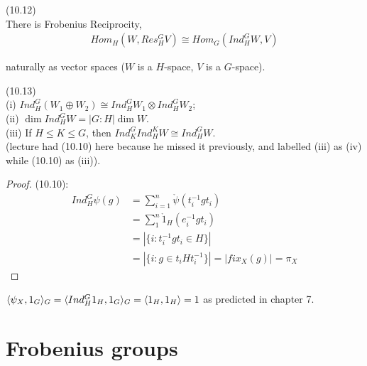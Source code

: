 \documentclass[a4paper]{article}
\begin{document}
\begin{rem} (10.12)\\
There is Frobenius Reciprocity,
\begin{equation*}
\begin{aligned}
Hom_H(W,Res_H^G V) \cong Hom_G (Ind_H^G W,V)
\end{aligned}
\end{equation*}
\end{rem}
naturally as vector spaces ($W$ is a $H$-space, $V$ is a $G$-space).

\begin{lemma} (10.13)\\
(i) $Ind_H^G(W_1 \oplus W_2) \cong Ind_H^G W_1 \otimes Ind_H^G W_2$;\\
(ii) $\dim Ind_H^G W = |G:H|\dim W$.\\
(iii) If $H \leq K \leq G$, then $Ind_K^G Ind_H^K W \cong Ind_H^G W$.\\
(lecture had (10.10) here because he missed it previously, and labelled (iii) as (iv) while (10.10) as (iii)).\\
\begin{proof}
(10.10):
\begin{equation*}
\begin{aligned}
Ind_H^G \psi(g) &= \sum_{i=1}^n \mathring{\psi}(t_i^{-1} gt_i)\\
&= \sum_1^n \mathring{1}_H (e_i^{-1} gt_i)\\
&= |\{ i: t_i^{-1} gt_i \in H\}|\\
&= |\{i : g \in t_i H t_i^{-1}\}| = |fix_X (g)| = \pi_X
\end{aligned}
\end{equation*}
\end{proof}
\end{lemma}

\begin{rem}
$\langle \psi_X,1_G\rangle_G = \langle Ind_H^G 1_H, 1_G\rangle_G = \langle 1_H,1_H\rangle = 1$ as predicted in chapter 7.
\end{rem}

\newpage
\section{Frobenius groups}
\end{document}
